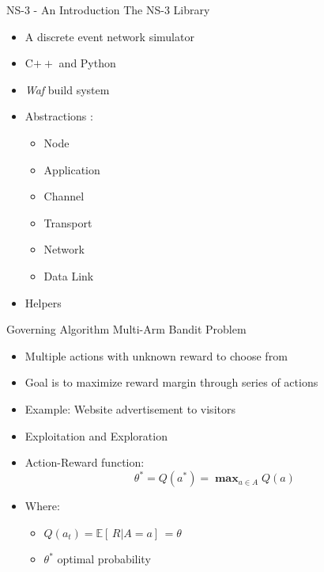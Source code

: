 \documentclass [xcolor=svgnames, t] {beamer}
\begin{document}
\begin{frame}{NS-3 - An Introduction \autocite{nsonline}}
    The NS-3 Library\\
    \vspace{.5cm}
    \begin{itemize}
        \item A discrete event network simulator
        \item C$++$ and Python
        \item \textit{Waf} build system
        \item Abstractions :
            \begin{itemize}
                \item Node
                \item Application
                \item Channel
                \item Transport
                \item Network
                \item Data Link
            \end{itemize}
        \item Helpers
    \end{itemize}
\end{frame}

\begin{frame}{Governing Algorithm}
    Multi-Arm Bandit Problem\autocite{Sutton&Barto}\\
    \vspace{.5cm}
    \begin{itemize}
        \item Multiple actions with unknown reward to choose from
        \item Goal is to maximize reward margin through series of actions
        \item Example: Website advertisement to visitors
        \item Exploitation and Exploration
        \item Action-Reward function:
            \begin{equation}
                \theta^* = Q(a^*) = \mathop{\textbf{max}}_{a{\in}A}Q(a)
            \end{equation}
        \item[] Where:
            \begin{itemize}[ ]
                \item[] $Q(a_t) = \mathbb{E}[\,R | A=a]\,= \theta$
                \item[] $\theta^*$ \hspace{0.3cm} optimal probability
            \end{itemize}
   \end{itemize}
  
\end{frame}
\end{document}
